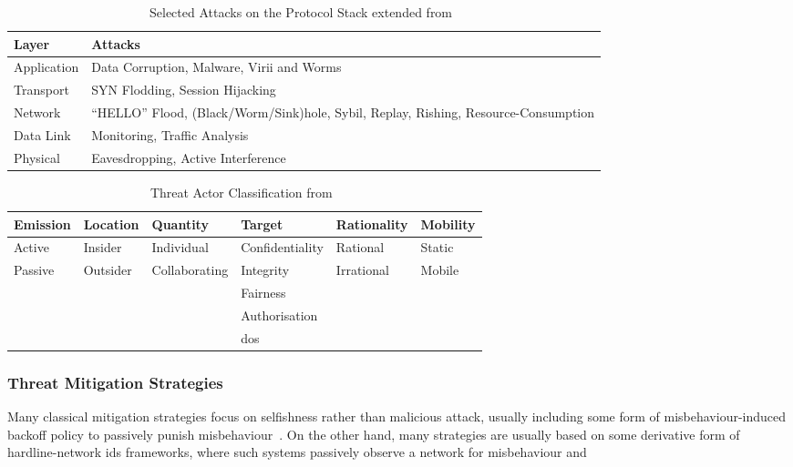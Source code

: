 \begin{table}
  \caption[Selected Attacks on the Protocol Stack]{Selected Attacks on the Protocol Stack extended from~\citet{csen2010security}}
  \label{tab:stack_attacks}
  \begin{tabularx}{\textwidth}{p{5cm} X}\toprule
    Layer & Attacks\\\midrule
    Application & Data Corruption, Malware, Virii and Worms\\
    Transport & SYN Flodding, Session Hijacking\\
    Network & ``HELLO'' Flood, (Black/Worm/Sink)hole, Sybil, Replay, Rishing, Resource-Consumption\\
    Data Link & Monitoring, Traffic Analysis\\
    Physical& Eavesdropping, Active Interference\\\bottomrule
  \end{tabularx}
\end{table}

\begin{table}
  \caption[Threat Actor Classification]{Threat Actor Classification from~\citet{Gagandeep2012}}
  \label{tab:attacker_class}
  \begin{tabularx}{\textwidth}{X X X X X X}\toprule
    Emission & Location & Quantity & Target & Rationality & Mobility \\\midrule
    Active & Insider & Individual & Confidentiality & Rational & Static\\
    Passive & Outsider & Collaborating & Integrity & Irrational & Mobile\\
            &         &               & Fairness & & \\
            &         &               & Authorisation & &\\
            &         &               &  \gls{dos} & &\\
    \bottomrule
    
  \end{tabularx}
\end{table}


\subsubsection{Threat Mitigation Strategies}



Many classical mitigation strategies focus on selfishness rather than malicious attack, usually including some form of misbehaviour-induced backoff policy to passively punish misbehaviour~\cite{Konorski2002,Cardenas:2004:DPM:1029102.1029107}.
On the other hand, many  strategies are usually based on some derivative form of hardline-network \gls{ids} frameworks, where such systems passively observe a network for misbehaviour and 

